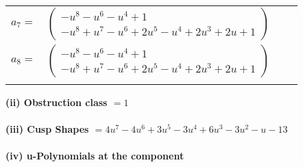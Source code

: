 \documentclass[1p]{elsarticle_modified}
\theoremstyle{definition}
\begin{document}
\begin{tabular}{m{7pt} m{180pt} m{7pt} m{180pt} }
\flushright $a_{7}=$&$\begin{pmatrix}- u^8- u^6- u^4+1\\- u^8+u^7- u^6+2 u^5- u^4+2 u^3+2 u+1\end{pmatrix}$ \\
\flushright $a_{8}=$&$\begin{pmatrix}- u^8- u^6- u^4+1\\- u^8+u^7- u^6+2 u^5- u^4+2 u^3+2 u+1\end{pmatrix}$\\&\end{tabular}
\flushleft \textbf{(ii) Obstruction class $= 1$}\\~\\
\flushleft \textbf{(iii) Cusp Shapes $= 4 u^7-4 u^6+3 u^5-3 u^4+6 u^3-3 u^2- u-13$}\\~\\
\newpage\renewcommand{\arraystretch}{1}
\flushleft \textbf{(iv) u-Polynomials at the component}\newline \\
\end{document}
